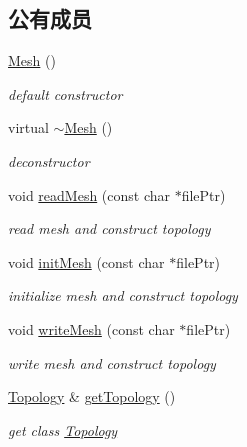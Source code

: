 \subsection*{公有成员}
\begin{DoxyCompactItemize}
\item 
\hyperlink{classHSF_1_1Mesh_acbd942f68387a832b8f7d5927db54eea}{Mesh} ()
\begin{DoxyCompactList}\small\item\em default constructor \item\end{DoxyCompactList}\item 
virtual \hyperlink{classHSF_1_1Mesh_a3920b19d7969a8bb5d1eb505ec9f43b4}{$\sim$Mesh} ()
\begin{DoxyCompactList}\small\item\em deconstructor \item\end{DoxyCompactList}\item 
void \hyperlink{classHSF_1_1Mesh_aa9073cb283b0b0be1a6131fc14fbabf3}{readMesh} (const char $\ast$filePtr)
\begin{DoxyCompactList}\small\item\em read mesh and construct topology \item\end{DoxyCompactList}\item 
void \hyperlink{classHSF_1_1Mesh_aeadaa406bc94ca79dbac39b69f0929a2}{initMesh} (const char $\ast$filePtr)
\begin{DoxyCompactList}\small\item\em initialize mesh and construct topology \item\end{DoxyCompactList}\item 
void \hyperlink{classHSF_1_1Mesh_a2cd3b5d0f1dcf97d7b4cb565b32bcaf8}{writeMesh} (const char $\ast$filePtr)
\begin{DoxyCompactList}\small\item\em write mesh and construct topology \item\end{DoxyCompactList}\item 
\hyperlink{classHSF_1_1Topology}{Topology} \& \hyperlink{classHSF_1_1Mesh_a3a340c548e7bf152dc70722cb64ab61c}{getTopology} ()
\begin{DoxyCompactList}\small\item\em get class \hyperlink{classHSF_1_1Topology}{Topology} \item\end{DoxyCompactList}\item 

\end{DoxyCompactItemize}

